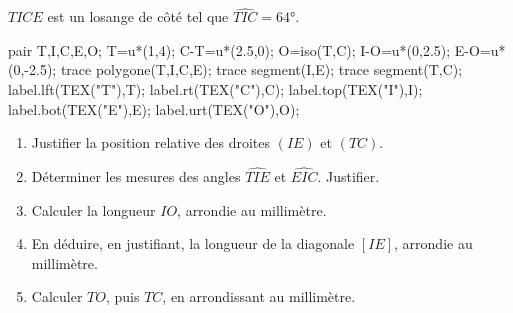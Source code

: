 \begin{exercice*}
    $TICE$ est un losange de côté  tel que $\widehat{TIC}=\ang{64}$.
    \begin{center}
        \begin{Geometrie}
            pair T,I,C,E,O;
            T=u*(1,4);
            C-T=u*(2.5,0);
            O=iso(T,C);
            I-O=u*(0,2.5);
            E-O=u*(0,-2.5);
            trace polygone(T,I,C,E);
            trace segment(I,E);
            trace segment(T,C);
            label.lft(TEX("T"),T);
            label.rt(TEX("C"),C);
            label.top(TEX("I"),I);
            label.bot(TEX("E"),E);
            label.urt(TEX("O"),O);
        \end{Geometrie}
    \end{center}
    \begin{enumerate}
        \item Justifier la position relative des droites $(IE)$ et $(TC)$.
        \item Déterminer les mesures des angles $\widehat{TIE}$ et $\widehat{EIC}$. Justifier.
        \item Calculer la longueur $IO$, arrondie au millimètre.
        \item En déduire, en justifiant, la longueur de la diagonale $[IE]$, arrondie au millimètre.
        \item Calculer $TO$, puis $TC$, en arrondissant au millimètre.
    \end{enumerate}
\end{exercice*}
